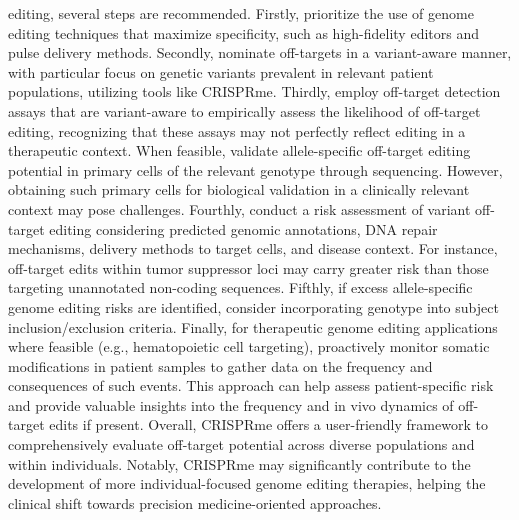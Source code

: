 \documentclass[a4paper, titlepage, openright]{book}
\newcommand{\crisprme}{CRISPRme\xspace}
\begin{document}
editing, several steps are recommended. Firstly, prioritize the use of genome editing techniques that maximize specificity, such as high-fidelity editors and pulse delivery methods. Secondly, nominate off-targets in a variant-aware manner, with particular focus on genetic variants prevalent in relevant patient populations, utilizing tools like \crisprme. Thirdly, employ off-target detection assays that are variant-aware to empirically assess the likelihood of off-target editing, recognizing that these assays may not perfectly reflect editing in a therapeutic context. When feasible, validate allele-specific off-target editing potential in primary cells of the relevant genotype through sequencing. However, obtaining such primary cells for biological validation in a clinically relevant context may pose challenges. Fourthly, conduct a risk assessment of variant off-target editing considering predicted genomic annotations, DNA repair mechanisms, delivery methods to target cells, and disease context. For instance, off-target edits within tumor suppressor loci may carry greater risk than those targeting unannotated non-coding sequences. Fifthly, if excess allele-specific genome editing risks are identified, consider incorporating genotype into subject inclusion/exclusion criteria. Finally, for therapeutic genome editing applications where feasible (e.g., hematopoietic cell targeting), proactively monitor somatic modifications in patient samples to gather data on the frequency and consequences of such events. This approach can help assess patient-specific risk and provide valuable insights into the frequency and in vivo dynamics of off-target edits if present. Overall, \crisprme offers a user-friendly framework to comprehensively evaluate off-target potential across diverse populations and within individuals. Notably, \crisprme may significantly contribute to the development of more individual-focused genome editing therapies, helping the clinical shift towards precision medicine-oriented approaches. 
\end{document}

